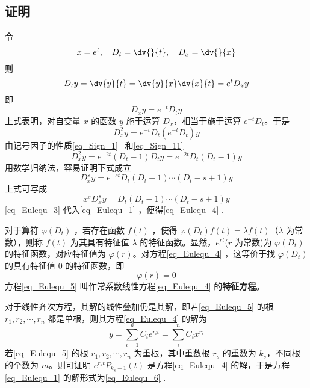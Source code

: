 \subsection{证明}
令
\begin{equation}
x=e^t,\quad D_t=\dv{}{t},\quad D_x=\dv{}{x}
\end{equation}
则
\begin{equation}
D_ty=\dv{y}{t}=\dv{y}{x}\dv{x}{t}=e^tD_xy
\end{equation}
即
\begin{equation}
D_xy=e^{-t}D_ty
\end{equation}
上式表明，对自变量 $x$ 的函数 $y$ 施于运算 $D_x$，相当于施于运算 $e^{-t}D_t$。于是
\begin{equation}
D_x^2y=e^{-t}D_t(e^{-t}D_t)y
\end{equation}
由记号因子的性质\autoref{eq_Sign_1}~ 和\autoref{eq_Sign_11}~
\begin{equation}
D_x^2y=e^{-2t}(D_t-1)D_ty=e^{-2t}D_t(D_t-1)y
\end{equation}
用数学归纳法，容易证明下式成立
\begin{equation}
D_x^sy=e^{-st}D_t(D_t-1)\cdots (D_t-s+1)y
\end{equation}
上式可写成
\begin{equation}\label{eq_Eulequ_3}
x^sD_x^sy=D_t(D_t-1)\cdots (D_t-s+1)y
\end{equation}
\autoref{eq_Eulequ_3} 代入\autoref{eq_Eulequ_1} ，便得\autoref{eq_Eulequ_4} .

对于算符 $\varphi(D_t)$ ，若存在函数 $f(t)$ ，使得
$\varphi(D_t)f(t)=\lambda f(t)$（$\lambda$ 为常数），则称 $f(t)$ 为其具有特征值 $\lambda$ 的特征函数。显然，$e^{rt}$($r$ 为常数)为 $\varphi(D_t)$ 的特征函数，对应特征值为 $\varphi(r)$。对方程\autoref{eq_Eulequ_4} ，这等价于找 $\varphi(D_t)$ 的具有特征值 $0$ 的特征函数，即
\begin{equation}\label{eq_Eulequ_5}
\varphi(r)=0
\end{equation}
方程\autoref{eq_Eulequ_5} 叫作常系数线性方程\autoref{eq_Eulequ_4} 的\textbf{特征方程}。

对于线性齐次方程，其解的线性叠加仍是其解，即若\autoref{eq_Eulequ_5} 的根 $r_1,r_2,\cdots,r_n$ 都是单根，则其方程\autoref{eq_Eulequ_4} 的解为
\begin{equation}
y=\sum_{i=1}^{n}C_ie^{r_it}=\sum_i^{n}C_ix^{r_i}
\end{equation}
 若\autoref{eq_Eulequ_5} 的根 $r_1,r_2,\cdots,r_n$ 为重根，其中重数根 $r_s$ 的重数为 $k_s$，不同根的个数为 $m$。则可证明 $e^{r_st}P_{k_s-1}(t)$ 是方程\autoref{eq_Eulequ_4} 的解，于是方程\autoref{eq_Eulequ_1} 的解形式为\autoref{eq_Eulequ_6} .
